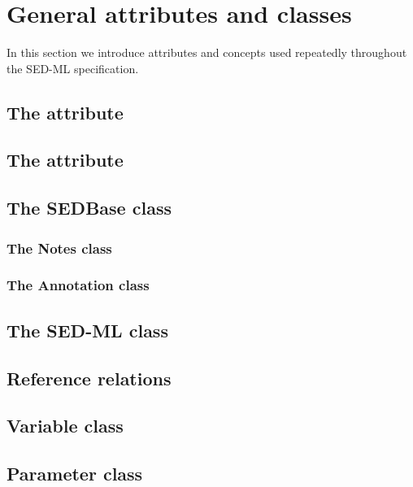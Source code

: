 \section{General attributes and classes}
In this section we introduce attributes and concepts used repeatedly throughout the SED-ML specification. 

\subsection{The   attribute}


\subsection{The  attribute}

\newpage
\subsection{The SEDBase class}


\subsubsection{The Notes class}


\subsubsection{The Annotation class}


\newpage
\subsection{The SED-ML class}


\newpage
\subsection{Reference relations}


\newpage
\subsection{Variable class}


\subsection{Parameter class}


